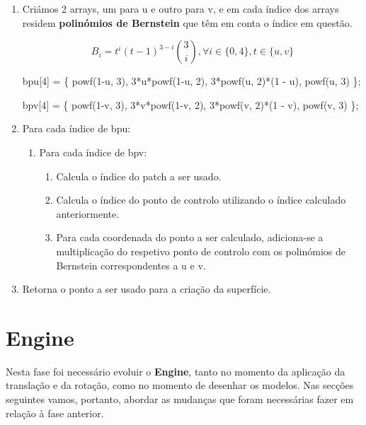 \documentclass[a4paper]{article}
\begin{document}
\ttfamily
\begin{enumerate}
  \item Criámos 2 arrays, um para u e outro para v, e em cada índice dos arrays residem \textbf{polinómios de Bernstein} que têm em conta o índice em questão.
  \vspace{0.5cm}

  \hspace{0.0cm} $$B_{i} = t^i (t-1)^{3-i} \binom{3}{i}  , \forall i \in \{0,4\}, t \in \{u,v\}$$

  \vspace{0.5cm}

  \hspace{-2.8cm}bpu[4] = \{ powf(1-u, 3), 3*u*powf(1-u, 2), 3*powf(u, 2)*(1 - u), powf(u, 3) \};

  \vspace{0.5cm}

  \hspace{-2.8cm}bpv[4] = \{ powf(1-v, 3), 3*v*powf(1-v, 2), 3*powf(v, 2)*(1 - v), powf(v, 3) \};

  \vspace{0.5cm}

  \item Para cada índice de bpu:
  \begin{enumerate}
  	\item Para cada índice de bpv:
	\begin{enumerate}
		\item Calcula o índice do patch a ser usado.
		\item Calcula o índice do ponto de controlo utilizando o índice calculado anteriormente.
		\item Para cada coordenada do ponto a ser calculado, adiciona-se a multiplicação do respetivo ponto de controlo com os polinómios de Bernstein correspondentes a u e v.
	\end{enumerate}
  \end{enumerate}
  \item Retorna o ponto a ser usado para a criação da superfície.
\end{enumerate}
\rmfamily



\newpage

\section{Engine}
\label{sec:engine}

Nesta fase foi necessário evoluir o \textbf{Engine}, tanto no momento da aplicação da translação e da rotação, como no momento de desenhar os modelos. Nas secções seguintes vamos, portanto, abordar as mudanças que foram necessárias fazer em relação à fase anterior.
\end{document}

